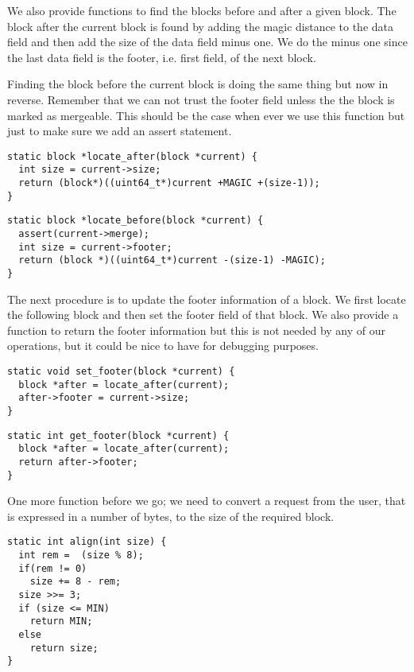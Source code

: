 \documentclass[a4paper,11pt]{article}
\begin{document}
 We also provide functions to find the blocks before and after a given
 block. The block after the current block is found by adding the magic
 distance to the data field and then add the size of the data field
 minus one. We do the minus one since the last data field is the
 footer, i.e. first field, of the next block.

 Finding the block before the current block is doing the same thing
 but now in reverse. Remember that we can not trust the footer field
 unless the the block is marked as mergeable. This should be the case
 when ever we use this function but just to make sure we add an assert
 statement. 
 
 \begin{lstlisting}
static block *locate_after(block *current) {
  int size = current->size;  
  return (block*)((uint64_t*)current +MAGIC +(size-1));
}
 \end{lstlisting}
 \begin{lstlisting}
static block *locate_before(block *current) {
  assert(current->merge);
  int size = current->footer;
  return (block *)((uint64_t*)current -(size-1) -MAGIC);
}
 \end{lstlisting}

 The next procedure is to update the footer information of a block.
 We first locate the following block and then set the footer field of
 that block. We also provide a function to return the footer
 information but this is not needed by any of our operations, but it
 could be nice to have for debugging purposes.

 \begin{lstlisting}
static void set_footer(block *current) {
  block *after = locate_after(current);
  after->footer = current->size;
}
 \end{lstlisting}
 \begin{lstlisting}
static int get_footer(block *current) {
  block *after = locate_after(current);
  return after->footer;
}
 \end{lstlisting}

 One more function before we go; we need to convert a request from the
 user, that is expressed in a number of bytes, to the size of the
 required block.

 \begin{lstlisting}
static int align(int size) {
  int rem =  (size % 8);
  if(rem != 0)
    size += 8 - rem;
  size >>= 3;
  if (size <= MIN)
    return MIN;
  else 
    return size;
}
 \end{lstlisting}
\end{document}
